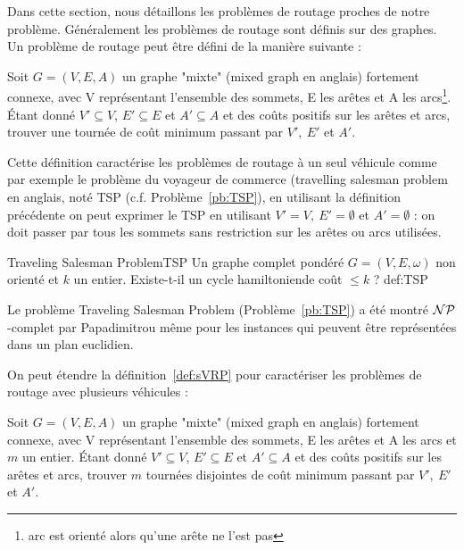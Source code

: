 Dans cette section, nous détaillons les problèmes de routage proches de notre problème.
Généralement les problèmes de routage sont définis sur des graphes.
Un problème de routage peut être défini de la manière suivante \cite{lenstra1981complexity} :
\begin{mydef}
Soit $G=(V,E,A)$ un graphe "mixte" (mixed graph en anglais) fortement connexe, avec V représentant l'ensemble des sommets, E les arêtes et A les arcs\footnote{\label{refnote} arc est orienté alors qu'une arête ne l'est pas}. Étant donné $V'\subseteq V$, $E'\subseteq E$ et $A'\subseteq A$ et des coûts positifs sur les arêtes et arcs, trouver une tournée de coût minimum passant par $V',~E'$ et $A'$. \label{def:sVRP}
\end{mydef}

Cette définition caractérise les problèmes de routage à un seul véhicule comme par exemple le problème du voyageur de commerce (travelling salesman problem en anglais, noté TSP (c.f. Problème~\ref{pb:TSP}), en utilisant la définition précédente on peut exprimer le TSP en utilisant $V' = V,~E'=\emptyset$ et $A' =\emptyset$ : on doit passer par tous les sommets sans restriction sur les arêtes ou arcs utilisées.

\begin{problem}{Traveling Salesman Problem}{TSP}
\label{pb:TSP}
\probdef
{Un graphe complet pondéré $G=(V,E,\omega)$ non orienté et $k$ un entier.}
{Existe-t-il un cycle hamiltonien\footnotemark de coût $\leq k$ ? }
{}{}{def:TSP}
\end{problem}

Le problème Traveling Salesman Problem (Problème~\ref{pb:TSP}) a été montré $\mathcal{NP}$-complet par Papadimitrou \cite{papadimitriou1977euclidean} même pour les instances qui peuvent être représentées dans un plan euclidien.

On peut étendre la définition~\ref{def:sVRP} pour caractériser les problèmes de routage avec plusieurs véhicules : 

\begin{mydef}
Soit $G=(V,E,A)$ un graphe "mixte" (mixed graph en anglais) fortement connexe, avec V représentant l'ensemble des sommets, E les arêtes et A les arcs et $m$ un entier. Étant donné $V'\subseteq V$, $E'\subseteq E$ et $A'\subseteq A$ et des coûts positifs sur les arêtes et arcs, trouver $m$ tournées disjointes de coût minimum passant par $V',~E'$ et $A'$. \label{def:mVRP}
\end{mydef}

